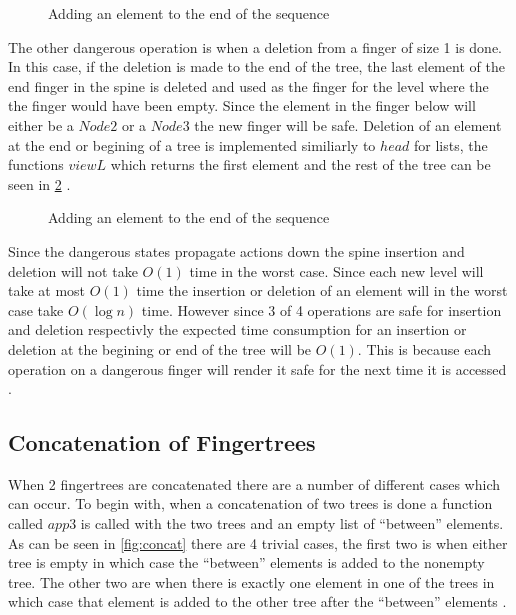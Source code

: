 \begin{figure}[h!]

\caption{Adding an element to the end of the sequence \label{fig:AddLast}\cite{fingertree}}
\end{figure}

The other dangerous operation is when a deletion from a finger of size 1 is
done. In this case, if the deletion is made to the end of the tree, the last
element of the end finger in the spine is deleted and used as the finger for the
level where the the finger would have been empty. Since the element in the
finger below will either be a $Node2$ or a $Node3$ the new finger will be safe.
Deletion of an element at the end or begining of a tree is implemented
similiarly to $head$ for lists, the functions $viewL$ which returns the first
element and the rest of the tree can be seen in \cref{fig:Viewl} \cite{fingertree}.

\begin{figure}[h!]

\caption{Adding an element to the end of the sequence \label{fig:Viewl} \cite{fingertree}}
\end{figure}

Since the dangerous states propagate actions down the spine insertion and
deletion will not take $O(1)$ time in the worst case. Since
each new level will take at most $O(1)$ time the insertion or deletion of an
element will in the worst case take $O(\log n)$ time. However since 3 of 4
operations are safe for insertion and deletion respectivly the expected time
consumption for an insertion or deletion at the begining or end of the tree will
be $O(1)$. This is because each operation on a dangerous finger will render it
safe for the next time it is accessed \cite{fingertree}.

\subsection{Concatenation of Fingertrees}
When 2 fingertrees are concatenated there are a number of different cases which
can occur. To begin with, when a concatenation of two trees is done a function
called $app3$ is called with the two trees and an empty list of ``between''
elements. As can be seen in \cref{fig:concat} there are 4 trivial cases, the first
two is when either tree is empty in which case the ``between'' elements is
added to the nonempty tree. The other two are when there is exactly one element
in one of the trees in which case that element is added to the other tree after
the ``between'' elements \cite{fingertree}.

